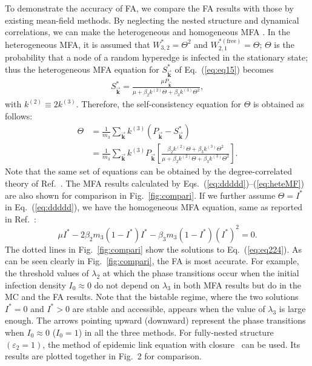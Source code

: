 \documentclass[aps,pre,twocolumn,nofootinbib,superscriptaddress,showpacs,showkeys]{revtex4-1}
\begin{document}
To demonstrate the accuracy of FA, we compare the FA results with those by existing mean-field methods. 
By neglecting the nested structure and dynamical correlations, we can make the heterogeneous and homogeneous MFA .
In the heterogeneous MFA, it is assumed that $W^*_{3,2}=\Theta^2$ and $W^{*(\mathrm{free})}_{2,1}=\Theta$; $\Theta$ is the probability   
that a node of a random hyperedge is infected in the stationary state; thus the heterogeneous MFA equation for 
$S^{*}_{\vec{\mathbf{k}}}$ of Eq.~(\ref{eq:eq15}) becomes
\begin{align}
S^{*}_{\vec{\mathbf{k}}}=\frac{{\mu}P_{\vec{\mathbf{k}}}}{\mu+\beta_{2}k^{(2)}\Theta+\beta_{3}k^{(3)}\Theta^{2}},
\label{eq:ddddd}
\end{align}
with $k^{(2)}\equiv 2k^{(3)}$.
Therefore, the self-consistency equation for $\Theta$ is obtained as follows:
\begin{align}
\Theta&=\frac{1}{m_3}\sum\limits_{\vec{\mathbf{k}}} k^{(3)}(P_{\vec{\mathbf{k}}}-S^{*}_{\vec{\mathbf{k}}})\nonumber
\\
&=\frac{1}{m_3}\sum\limits_{\vec{\mathbf{k}}} k^{(3)}P_{\vec{\mathbf{k}}}\left[\frac{\beta_{2}k^{(2)}\Theta+\beta_{3}k^{(3)}\Theta^{2}}{\mu+\beta_{2}k^{(2)}\Theta+\beta_{3}k^{(3)}\Theta^{2}}\right].
\label{eq:heteMF}
\end{align}
Note that the same set of equations can be obtained by the degree-correlated theory of Ref.~\cite{r28}.
The MFA results calculated by Eqs.~(\ref{eq:ddddd})--(\ref{eq:heteMF}) are also shown for comparison in Fig.~\ref{fig:compari}.
If we further assume $\Theta=I^{*}$ in Eq.~(\ref{eq:ddddd}), we have the homogeneous MFA equation, same as reported in Ref.~\cite{SCM}:
\begin{equation}
    \mu I^*-2\beta_{2}m_3(1-I^{*})I^{*}-\beta_{3}m_{3}(1-I^{*})(I^{*})^{2}=0.
\label{eq:eq224}
\end{equation}
The dotted lines in Fig.~\ref{fig:compari} show the solutions to Eq.~(\ref{eq:eq224}).   
As can be seen clearly in Fig.~\ref{fig:compari}, the FA is most accurate. For example, the threshold values of $\lambda_2$ at which the phase transitions occur when the initial infection density $I_0\approx 0$ do not depend on $\lambda_3$ in both MFA results but do in the MC and the FA results. 
Note that the bistable regime, where the two solutions $I^*=0$ and $I^*>0$ are stable and accessible, appears when the value of $\lambda_3$ is large enough.
The arrows pointing upward (downward) represent the phase transitions when $I_0\approx 0$ ($I_0=1$) in all the three methods. 
For fully-nested structure $(\varepsilon_2=1)$, the method of epidemic link equation with closure~\cite{r29} can be used. Its results are plotted together in Fig.~2 for comparison. 
\end{document}
